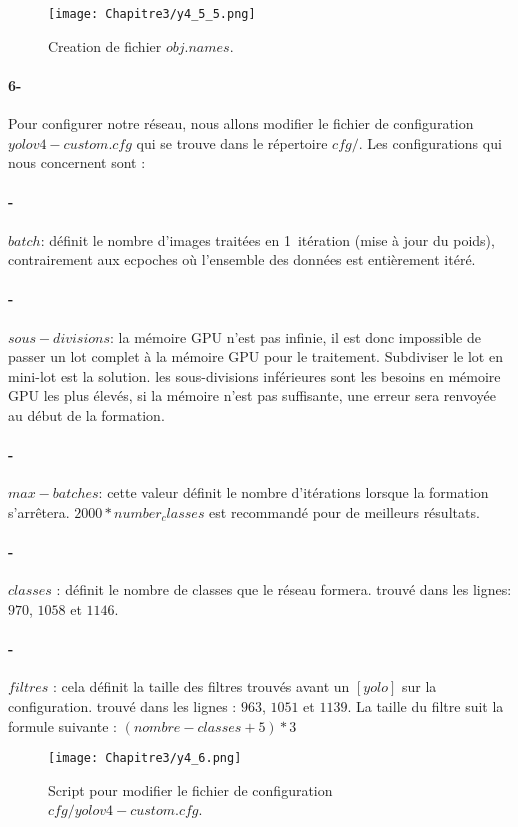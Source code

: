       \begin{figure}[H]
               \centering
               \texttt{[image: Chapitre3/y4\_5\_5.png]}
               \caption{Creation de fichier \(obj.names\).}
               \label{y4_5_5}
               \end{figure}
           
     
     \paragraph{6-} Pour configurer notre réseau, nous allons modifier le fichier de configuration \(yolov4-custom.cfg\) qui se trouve dans le répertoire \(cfg/\). Les configurations qui nous concernent sont :
     \paragraph{-} \(batch\): définit le nombre d'images traitées en 1 itération (mise à jour du poids), contrairement aux ecpoches où l'ensemble des données est entièrement itéré.
     \paragraph{-} \(sous-divisions\): la mémoire GPU n'est pas infinie, il est donc impossible de passer un lot complet à la mémoire GPU pour le traitement. Subdiviser le lot en mini-lot est la solution. les sous-divisions inférieures sont les besoins en mémoire GPU les plus élevés, si la mémoire n'est pas suffisante, une erreur sera renvoyée au début de la formation.
     \paragraph{-} \(max-batches\): cette valeur définit le nombre d'itérations lorsque la formation s'arrêtera. \(2000 * number_classes\) est recommandé pour de meilleurs résultats.
     \paragraph{-} \(classes\) : définit le nombre de classes que le réseau formera. trouvé dans les lignes: $970$, $1058$ et $1146$.
     \paragraph{-} \(filtres\) : cela définit la taille des filtres trouvés avant un $[yolo]$ sur la configuration. trouvé dans les lignes : $963$, $1051$ et $1139$. La taille du filtre suit la formule suivante : $(nombre-classes + 5) * 3$
     \begin{figure}[H]
               \centering
               \texttt{[image: Chapitre3/y4\_6.png]}
               \caption{Script pour modifier le fichier de configuration $cfg/yolov4-custom.cfg$.}
               \label{y4_6}
               \end{figure}
     
